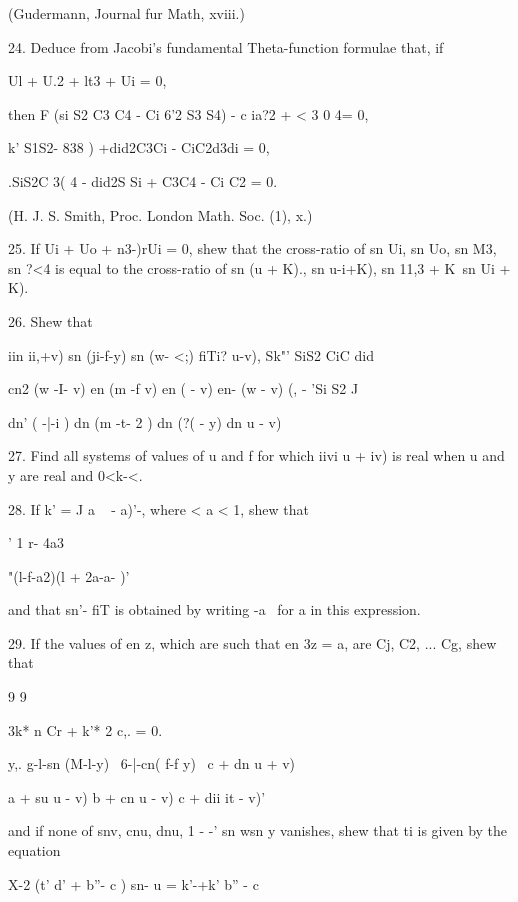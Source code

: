 (Gudermann, Journal fur Math, xviii.)

24. Deduce from Jacobi's fundamental Theta-function formulae that, if

Ul + U.2 + lt3 + Ui = 0,

then F (si S2 C3 C4 - Ci 6'2 S3 S4) - c ia?2 + < 3 0 4= 0,

k' S1S2- 838 ) +did2C3Ci - CiC2d3di = 0,

.SiS2C 3( 4 - did2S Si + C3C4 - Ci C2 = 0.

(H. J. S. Smith, Proc. London Math. Soc. (1), x.)

25. If Ui + Uo + n3-)rUi = 0, shew that the cross-ratio of sn Ui, sn
Uo, sn M3, sn ?<4 is equal to the cross-ratio of sn (u + K)., sn
u-i+K), sn 11,3 + K\ sn Ui + K).


26. Shew that

iin ii,+v) sn (ji-f-y) sn (w- <;) fiTi? u-v), Sk"' SiS2 CiC did

cn2 (w -I- v) en (m -f v) en ( - v) en- (w - v) (, - 'Si S2 J

dn' ( -|-i ) dn (m -t- 2 ) dn (?( - y) dn u - v)


27. Find all systems of values of u and f for which iivi u + iv) is
real when u and y are real and 0<k-<. 

28. If k' = J a ~ - a)'-, where < a < 1, shew that

' 1 r- 4a3

 "(l-f-a2)(l + 2a-a- )'

and that sn'- fiT is obtained by writing -a~ for a in this expression.


29. If the values of en z, which are such that en 3z = a, are Cj, C2,
... Cg, shew that

9 9

3k* n Cr + k'* 2 c,. = 0.


y,. g-l-sn (M-l-y) \ 6-|-cn( f-f y) \ c + dn u + v)

a + su u - v) b + cn u - v) c + dii it - v)'

and if none of snv, cnu, dnu, 1 - -' sn wsn y vanishes, shew that ti
is given by the equation

X-2 (t' d' + b''- c ) sn- u = k'-+k' b'' - c\


